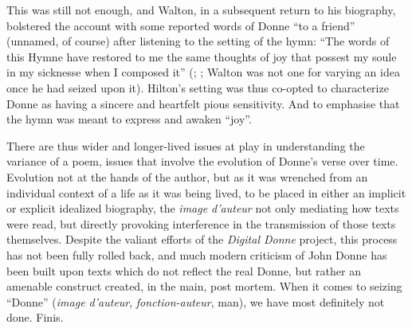 \begin{paper}
This was still not enough, and Walton, in a subsequent return to his
biography, bolstered the account with some reported words of Donne ``to
a friend'' (unnamed, of course) after listening to the setting of the
hymn: ``The words of this Hymne have restored to me the same thoughts of
joy that possest my soule in my sicknesse when I composed it'' (\citealt[77]{walton_life_1658}; \citealt[55]{walton_lives_1670}; Walton was not one for varying an idea once he had
seized upon it). Hilton's setting was thus co-opted to characterize
Donne as having a sincere and heartfelt pious sensitivity. And to
emphasise that the hymn was meant to express and awaken ``joy''.

There are thus wider and longer-lived issues at play in understanding
the variance of a poem, issues that involve the evolution of Donne's
verse over time. Evolution not at the hands of the author, but as it was
wrenched from an individual context of a life as it was being lived, to
be placed in either an implicit or explicit idealized biography, the
\emph{image d'auteur} not only mediating how texts were read, but
directly provoking interference in the transmission of those texts
themselves. Despite the valiant efforts of the \emph{Digital Donne}
project, this process has not been fully rolled back, and much modern
criticism of John Donne has been built upon texts which do not reflect
the real Donne, but rather an amenable construct created, in the main,
post mortem. When it comes to seizing ``Donne'' (\emph{image d'auteur},
\emph{fonction-auteur}, man), we have most definitely not done. Finis.

\begin{flushleft}
  
\end{flushleft}
\end{paper}